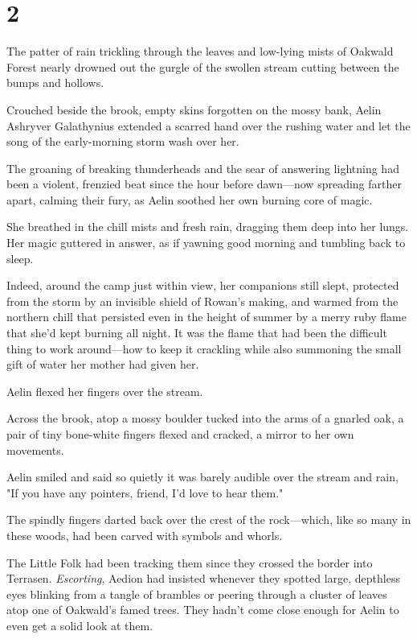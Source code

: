 
\chapter{2}

The patter of rain trickling through the leaves and low-lying mists of Oakwald Forest nearly drowned out the gurgle of the swollen stream cutting between the bumps and hollows.

Crouched beside the brook, empty skins forgotten on the mossy bank, Aelin Ashryver Galathynius extended a scarred hand over the rushing water and let the song of the early-morning storm wash over her.

The groaning of breaking thunderheads and the sear of answering lightning had been a violent, frenzied beat since the hour before dawn---now spreading farther apart, calming their fury, as Aelin soothed her own burning core of magic.

She breathed in the chill mists and fresh rain, dragging them deep into her lungs. Her magic guttered in answer, as if yawning good morning and tumbling back to sleep.

Indeed, around the camp just within view, her companions still slept, protected from the storm by an invisible shield of Rowan's making, and warmed from the northern chill that persisted even in the height of summer by a merry ruby flame that she'd kept burning all night. It was the flame that had been the difficult thing to work around---how to keep it crackling while also summoning the small gift of water her mother had given her.

Aelin flexed her fingers over the stream.

Across the brook, atop a mossy boulder tucked into the arms of a gnarled oak, a pair of tiny bone-white fingers flexed and cracked, a mirror to her own movements.

Aelin smiled and said so quietly it was barely audible over the stream and rain, "If you have any pointers, friend, I'd love to hear them."

The spindly fingers darted back over the crest of the rock---which, like so many in these woods, had been carved with symbols and whorls.

The Little Folk had been tracking them since they crossed the border into Terrasen. \emph{Escorting}, Aedion had insisted whenever they spotted large, depthless eyes blinking from a tangle of brambles or peering through a cluster of leaves atop one of Oakwald's famed trees. They hadn't come close enough for Aelin to even get a solid look at them.

